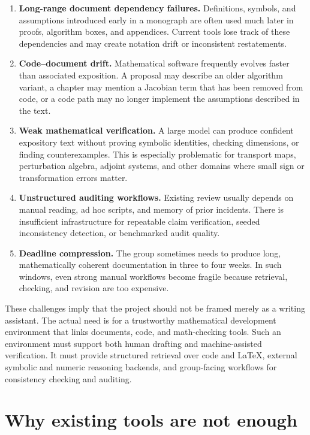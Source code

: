 \begin{enumerate}[label=\arabic*.]
  \item \textbf{Long-range document dependency failures.} Definitions, symbols, and assumptions introduced early in a monograph are often used much later in proofs, algorithm boxes, and appendices. Current tools lose track of these dependencies and may create notation drift or inconsistent restatements.
  \item \textbf{Code--document drift.} Mathematical software frequently evolves faster than associated exposition. A proposal may describe an older algorithm variant, a chapter may mention a Jacobian term that has been removed from code, or a code path may no longer implement the assumptions described in the text.
  \item \textbf{Weak mathematical verification.} A large model can produce confident expository text without proving symbolic identities, checking dimensions, or finding counterexamples. This is especially problematic for transport maps, perturbation algebra, adjoint systems, and other domains where small sign or transformation errors matter.
  \item \textbf{Unstructured auditing workflows.} Existing review usually depends on manual reading, ad hoc scripts, and memory of prior incidents. There is insufficient infrastructure for repeatable claim verification, seeded inconsistency detection, or benchmarked audit quality.
  \item \textbf{Deadline compression.} The group sometimes needs to produce long, mathematically coherent documentation in three to four weeks. In such windows, even strong manual workflows become fragile because retrieval, checking, and revision are too expensive.
\end{enumerate}

These challenges imply that the project should not be framed merely as a writing assistant. The actual need is for a trustworthy mathematical development environment that links documents, code, and math-checking tools. Such an environment must support both human drafting and machine-assisted verification. It must provide structured retrieval over code and LaTeX, external symbolic and numeric reasoning backends, and group-facing workflows for consistency checking and auditing.

\section{Why existing tools are not enough}

